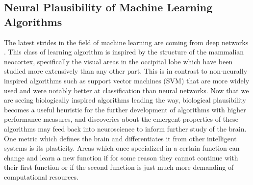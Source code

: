 \documentclass[12pt]{article}
\begin{document}
\begin{doublespacing}
	\subsection{Neural Plausibility of Machine Learning Algorithms}
		The latest strides in the field of machine learning are coming from deep networks \cite{bengio2009learning, grubb2010boosted, hinton2012deep, lee2009convolutional, krizhevsky2012imagenet, tang2012deep}. This class of learning algorithm is inspired by the structure of the mammalian neocortex, specifically the visual areas in the occipital lobe which have been studied more extensively than any other part. This is in contrast to non-neurally inspired algorithms such as support vector machines  (SVM) that are more widely used and were notably better at classification than neural networks\cite{byvatov2003comparison, ding2001multi, mukkamala2002intrusion}. Now that we are seeing biologically inspired algorithms leading the way, biological plausibility becomes a useful heuristic for the further development of algorithms with higher performance measures, and discoveries about the emergent properties of these algorithms may feed back into neuroscience to inform further study of the brain. 
		One metric which defines the brain and differentiates it from other intelligent systems is its plasticity. Areas which once specialized in a certain function can change and learn a new function if for some reason they cannot continue with their first function or if the second function is just much more demanding of computational resources. \cite{sharma2000induction}
		

\end{doublespacing}
\end{document}
